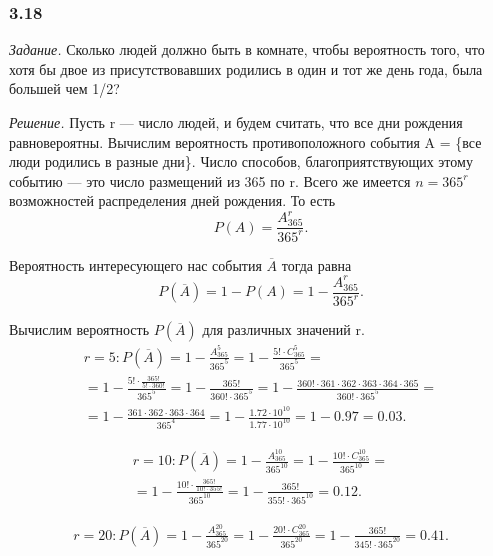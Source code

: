 \subsubsection*{3.18}

\textit{Задание.} Сколько людей должно быть в комнате, чтобы вероятность того, что хотя бы двое из присутствовавших родились в один и тот же день года, была большей чем 1/2?

\textit{Решение.} Пусть r --- число людей, и будем считать, что все дни рождения равновероятны.
Вычислим вероятность противоположного события A = \{все люди родились в разные дни\}.
Число способов, благоприятствующих этому событию --- это число размещений из 365 по r.
Всего же имеется $ n = 365^r $ возможностей распределения дней рождения.
То есть
$$ P(A) =
\frac{A_{365}^r}{365^r}.$$

Вероятность интересующего нас события $ \overline{A} $ тогда равна
$$ P \left( \overline{A} \right) =
1 - P \left( A \right) =
1 - \frac{A_{365}^r}{365^r}.$$

Вычислим вероятность $ P \left( \overline{A} \right) $ для различных значений r.
\begin{equation*}
\begin{split}
r = 5 : P \left( \overline{A} \right) =
1 - \frac{A_{365}^5}{365^5} =
1 - \frac{5! \cdot C_{365}^5}{365^5} = \\
= 1 - \frac{5! \cdot \frac{365!}{5! \cdot 360!} }{365^5} =
1 - \frac{365!}{360! \cdot 365^5} =
1 - \frac{360! \cdot 361 \cdot 362 \cdot 363 \cdot 364 \cdot 365}{360! \cdot 365^5} = \\
= 1 - \frac{361 \cdot 362 \cdot 363 \cdot 364}{365^4} =
1 - \frac{1.72 \cdot 10^{10}}{1.77 \cdot 10^{10}} =
1 - 0.97 =
0.03.
\end{split}
\end{equation*}

\begin{equation*}
\begin{split}
r = 10 :
P \left( \overline{A} \right) =
1 - \frac{A_{365}^{10}}{365^{10}} =
1- \frac{10! \cdot C_{365}^{10}}{365^{10}} = \\
= 1 - \frac{10! \cdot \frac{365!}{10! \cdot 355!}}{365^{10}} =
1 - \frac{365!}{355! \cdot 365^{10}} =
0.12.
\end{split}
\end{equation*}

\begin{equation*}
\begin{split}
r = 20 :
P \left( \overline{A} \right) =
1 - \frac{A_{365}^{20}}{365^{20}} =
1 - \frac{20! \cdot C_{365}^{20}}{365^{20}} =
1 - \frac{365!}{345! \cdot 365^{20}} =
0.41.
\end{split}
\end{equation*}

